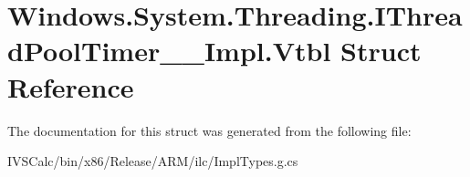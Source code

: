 \hypertarget{struct_windows_1_1_system_1_1_threading_1_1_i_thread_pool_timer_____impl_1_1_vtbl}{}\section{Windows.\+System.\+Threading.\+I\+Thread\+Pool\+Timer\+\_\+\+\_\+\+Impl.\+Vtbl Struct Reference}
\label{struct_windows_1_1_system_1_1_threading_1_1_i_thread_pool_timer_____impl_1_1_vtbl}


The documentation for this struct was generated from the following file\+:\begin{DoxyCompactItemize}
\item 
I\+V\+S\+Calc/bin/x86/\+Release/\+A\+R\+M/ilc/Impl\+Types.\+g.\+cs\end{DoxyCompactItemize}
